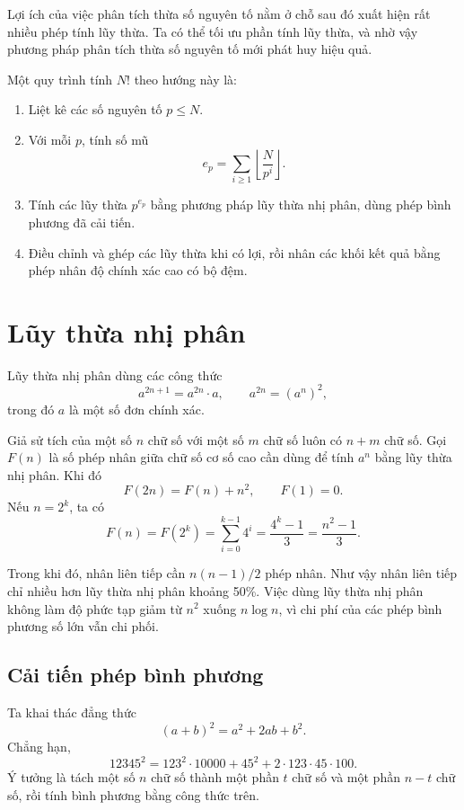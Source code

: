 \documentclass[11pt]{article}
\begin{document}
Lợi ích của việc phân tích thừa số nguyên tố nằm ở chỗ sau đó xuất hiện rất
nhiều phép tính lũy thừa. Ta có thể tối ưu phần tính lũy thừa, và nhờ vậy
phương pháp phân tích thừa số nguyên tố mới phát huy hiệu quả.

Một quy trình tính \(N!\) theo hướng này là:
\begin{enumerate}
  \item Liệt kê các số nguyên tố \(p\le N\).
  \item Với mỗi \(p\), tính số mũ
  \[
    e_p=\sum_{i\ge 1}\left\lfloor\frac{N}{p^i}\right\rfloor.
  \]
  \item Tính các lũy thừa \(p^{e_p}\) bằng phương pháp lũy thừa nhị phân,
  dùng phép bình phương đã cải tiến.
  \item Điều chỉnh và ghép các lũy thừa khi có lợi, rồi nhân các khối kết
  quả bằng phép nhân độ chính xác cao có bộ đệm.
\end{enumerate}

\section{Lũy thừa nhị phân}

Lũy thừa nhị phân dùng các công thức
\[
  a^{2n+1}=a^{2n}\cdot a,\qquad
  a^{2n}=(a^n)^2,
\]
trong đó \(a\) là một số đơn chính xác.

Giả sử tích của một số \(n\) chữ số với một số \(m\) chữ số luôn có \(n+m\)
chữ số. Gọi \(F(n)\) là số phép nhân giữa chữ số cơ số cao cần dùng để tính
\(a^n\) bằng lũy thừa nhị phân. Khi đó
\[
  F(2n)=F(n)+n^2,\qquad F(1)=0.
\]
Nếu \(n=2^k\), ta có
\[
  F(n)=F(2^k)=\sum_{i=0}^{k-1}4^i
  =\frac{4^k-1}{3}
  =\frac{n^2-1}{3}.
\]

Trong khi đó, nhân liên tiếp cần \(n(n-1)/2\) phép nhân. Như vậy nhân liên
tiếp chỉ nhiều hơn lũy thừa nhị phân khoảng 50\%. Việc dùng lũy thừa nhị phân
không làm độ phức tạp giảm từ \(n^2\) xuống \(n\log n\), vì chi phí của các
phép bình phương số lớn vẫn chi phối.

\subsection{Cải tiến phép bình phương}

Ta khai thác đẳng thức
\[
  (a+b)^2=a^2+2ab+b^2.
\]
Chẳng hạn,
\[
  12345^2=123^2\cdot 10000+45^2+2\cdot 123\cdot 45\cdot 100.
\]
Ý tưởng là tách một số \(n\) chữ số thành một phần \(t\) chữ số và một phần
\(n-t\) chữ số, rồi tính bình phương bằng công thức trên.
\end{document}
